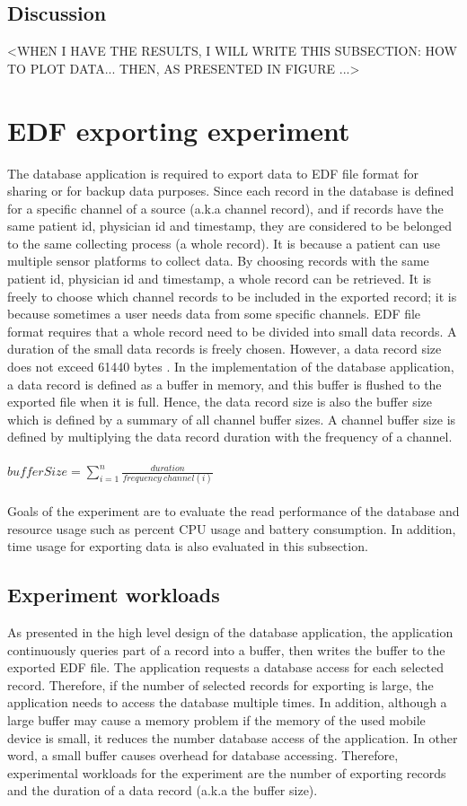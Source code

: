 \subsection{Discussion}
<WHEN I HAVE THE RESULTS, I WILL WRITE THIS SUBSECTION: HOW TO PLOT DATA... THEN, AS PRESENTED IN FIGURE ...>
\section{EDF exporting experiment}
The database application is required to export data to EDF file format for sharing or for backup data purposes. Since each record in the database is defined for a specific channel of a source (a.k.a channel record), and if records have the same patient id, physician id and timestamp, they are considered to be belonged to the same collecting process (a whole record). It is because a patient can use multiple sensor platforms to collect data. By choosing records with the same patient id, physician id and timestamp, a whole record can be retrieved. It is freely to choose which channel records to be included in the exported record; it is because sometimes a user needs data from some specific channels. EDF file format requires that a whole record need to be divided into small data records. A duration of the small data records is freely chosen. However, a data record size does not exceed 61440 bytes \citep{EDFpluss}. In the implementation of the database application, a data record is defined as a buffer in memory, and this buffer is flushed to the exported file when it is full. Hence, the data record size is also the buffer size which is defined by a summary of all channel buffer sizes. A channel buffer size is defined by multiplying the data record duration with the frequency of a channel.\\\\
$bufferSize=\sum_{i = 1}^{n}\frac{duration}{frequency\ channel(i)}$\\\\
Goals of the experiment are to evaluate the read performance of the database and resource usage such as percent CPU usage and battery consumption. In addition, time usage for exporting data is also evaluated in this subsection.
\subsection{Experiment workloads}
As presented in the high level design of the database application, the application continuously queries part of a record into a buffer, then writes the buffer to the exported EDF file. The application requests a database access for each selected record. Therefore, if the number of selected records for exporting is large, the application needs to access the database multiple times. In addition, although a large buffer may cause a memory problem if the memory of the used mobile device is small, it reduces the number database access of the application. In other word, a small buffer causes overhead for database accessing.
Therefore, experimental workloads for the experiment are the number of exporting records and the duration of a data record (a.k.a the buffer size).
